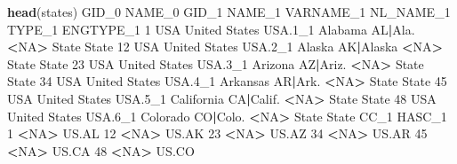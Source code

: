 \documentclass[
]{book}
\newenvironment{Shaded}{\begin{snugshade}}{\end{snugshade}}
\newcommand{\DecValTok}[1]{\textcolor[rgb]{0.00,0.00,0.81}{#1}}
\newcommand{\FloatTok}[1]{\textcolor[rgb]{0.00,0.00,0.81}{#1}}
\newcommand{\KeywordTok}[1]{\textcolor[rgb]{0.13,0.29,0.53}{\textbf{#1}}}
\newcommand{\NormalTok}[1]{#1}
\newcommand{\OperatorTok}[1]{\textcolor[rgb]{0.81,0.36,0.00}{\textbf{#1}}}
\newcommand{\OtherTok}[1]{\textcolor[rgb]{0.56,0.35,0.01}{#1}}
\newcommand{\StringTok}[1]{\textcolor[rgb]{0.31,0.60,0.02}{#1}}
\begin{document}
\begin{Shaded}
\begin{Highlighting}[]
\KeywordTok{head}\NormalTok{(states)}
\NormalTok{   GID_}\DecValTok{0}\NormalTok{        NAME_}\DecValTok{0}\NormalTok{   GID_}\DecValTok{1}\NormalTok{     NAME_}\DecValTok{1}\NormalTok{ VARNAME_}\DecValTok{1}\NormalTok{ NL_NAME_}\DecValTok{1}\NormalTok{ TYPE_}\DecValTok{1}\NormalTok{ ENGTYPE_}\DecValTok{1}
\DecValTok{1}\NormalTok{    USA United States USA}\FloatTok{.1}\NormalTok{_}\DecValTok{1}\NormalTok{    Alabama   AL}\OperatorTok{|}\NormalTok{Ala.      }\OperatorTok{<}\OtherTok{NA}\OperatorTok{>}\StringTok{  }\NormalTok{State     State}
\DecValTok{12}\NormalTok{   USA United States USA}\FloatTok{.2}\NormalTok{_}\DecValTok{1}\NormalTok{     Alaska AK}\OperatorTok{|}\NormalTok{Alaska      }\OperatorTok{<}\OtherTok{NA}\OperatorTok{>}\StringTok{  }\NormalTok{State     State}
\DecValTok{23}\NormalTok{   USA United States USA}\FloatTok{.3}\NormalTok{_}\DecValTok{1}\NormalTok{    Arizona  AZ}\OperatorTok{|}\NormalTok{Ariz.      }\OperatorTok{<}\OtherTok{NA}\OperatorTok{>}\StringTok{  }\NormalTok{State     State}
\DecValTok{34}\NormalTok{   USA United States USA}\FloatTok{.4}\NormalTok{_}\DecValTok{1}\NormalTok{   Arkansas   AR}\OperatorTok{|}\NormalTok{Ark.      }\OperatorTok{<}\OtherTok{NA}\OperatorTok{>}\StringTok{  }\NormalTok{State     State}
\DecValTok{45}\NormalTok{   USA United States USA}\FloatTok{.5}\NormalTok{_}\DecValTok{1}\NormalTok{ California CA}\OperatorTok{|}\NormalTok{Calif.      }\OperatorTok{<}\OtherTok{NA}\OperatorTok{>}\StringTok{  }\NormalTok{State     State}
\DecValTok{48}\NormalTok{   USA United States USA}\FloatTok{.6}\NormalTok{_}\DecValTok{1}\NormalTok{   Colorado  CO}\OperatorTok{|}\NormalTok{Colo.      }\OperatorTok{<}\OtherTok{NA}\OperatorTok{>}\StringTok{  }\NormalTok{State     State}
\NormalTok{   CC_}\DecValTok{1}\NormalTok{ HASC_}\DecValTok{1}
\DecValTok{1}  \OperatorTok{<}\OtherTok{NA}\OperatorTok{>}\StringTok{  }\NormalTok{US.AL}
\DecValTok{12} \OperatorTok{<}\OtherTok{NA}\OperatorTok{>}\StringTok{  }\NormalTok{US.AK}
\DecValTok{23} \OperatorTok{<}\OtherTok{NA}\OperatorTok{>}\StringTok{  }\NormalTok{US.AZ}
\DecValTok{34} \OperatorTok{<}\OtherTok{NA}\OperatorTok{>}\StringTok{  }\NormalTok{US.AR}
\DecValTok{45} \OperatorTok{<}\OtherTok{NA}\OperatorTok{>}\StringTok{  }\NormalTok{US.CA}
\DecValTok{48} \OperatorTok{<}\OtherTok{NA}\OperatorTok{>}\StringTok{  }\NormalTok{US.CO}
\end{Highlighting}
\end{Shaded}
\end{document}
